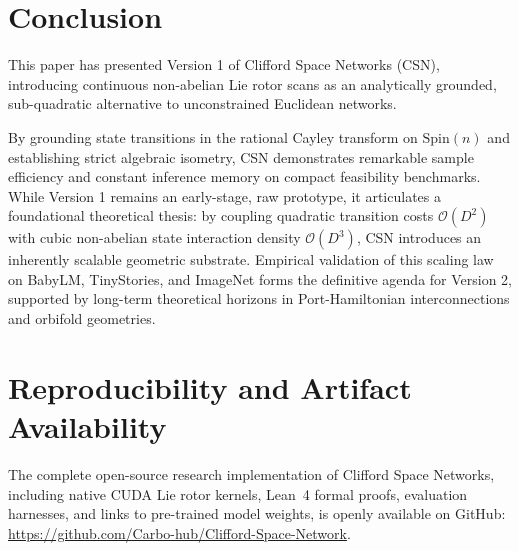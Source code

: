 \documentclass[11pt,a4paper]{article}
\begin{document}
\section{Conclusion}

This paper has presented Version 1 of Clifford Space Networks (CSN), introducing continuous non-abelian Lie rotor scans as an analytically grounded, sub-quadratic alternative to unconstrained Euclidean networks. 

By grounding state transitions in the rational Cayley transform on $\mathrm{Spin}(n)$ and establishing strict algebraic isometry, CSN demonstrates remarkable sample efficiency and constant inference memory on compact feasibility benchmarks. While Version 1 remains an early-stage, raw prototype, it articulates a foundational theoretical thesis: by coupling quadratic transition costs $\mathcal{O}(D^2)$ with cubic non-abelian state interaction density $\mathcal{O}(D^3)$, CSN introduces an inherently scalable geometric substrate. Empirical validation of this scaling law on BabyLM, TinyStories, and ImageNet forms the definitive agenda for Version 2, supported by long-term theoretical horizons in Port-Hamiltonian interconnections and orbifold geometries.

\section*{Reproducibility and Artifact Availability}

The complete open-source research implementation of Clifford Space Networks, including native CUDA Lie rotor kernels, Lean~4 formal proofs, evaluation harnesses, and links to pre-trained model weights, is openly available on GitHub: \url{https://github.com/Carbo-hub/Clifford-Space-Network}.



\end{document}
